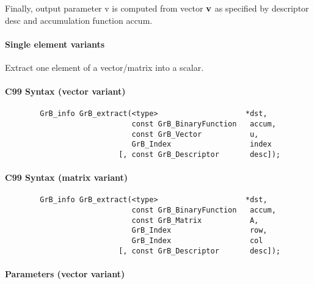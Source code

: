 Finally, output parameter {\sf v} is computed from vector ${\bf v}$ as
specified by descriptor {\sf desc} and accumulation function {\sf accum}.

\paragraph{Single element variants}

Extract one element of a vector/matrix into a scalar. 

\paragraph{C99 Syntax (vector variant)}

\begin{verbatim}
        GrB_info GrB_extract(<type>                    *dst,
                             const GrB_BinaryFunction   accum,
                             const GrB_Vector           u,
                             GrB_Index                  index
                          [, const GrB_Descriptor       desc]); 
\end{verbatim}

\paragraph{C99 Syntax (matrix variant)}

\begin{verbatim}
        GrB_info GrB_extract(<type>                    *dst,
                             const GrB_BinaryFunction   accum,
                             const GrB_Matrix           A,
                             GrB_Index                  row,
                             GrB_Index                  col
                          [, const GrB_Descriptor       desc]); 

\end{verbatim}

\paragraph{Parameters (vector variant)}

